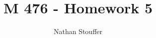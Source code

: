 \documentclass{article}
\begin{document}
\title{M 476 - Homework 5}
\author{Nathan Stouffer}

\maketitle
\newpage
\end{document}
